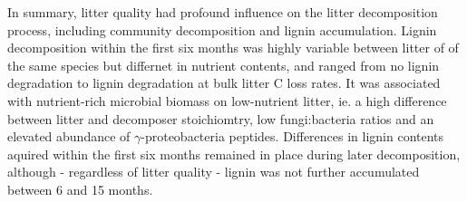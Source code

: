 

In summary, litter quality had profound influence on the litter decomposition process, including community decomposition and lignin accumulation. Lignin decomposition within the first six months was highly variable between litter of of the same species but differnet in nutrient contents, and ranged from no lignin degradation to lignin degradation at bulk litter C loss rates. It was associated with nutrient-rich microbial biomass on low-nutrient litter, ie. a high difference between litter and decomposer stoichiomtry, low fungi:bacteria ratios and an elevated abundance of $\gamma$-proteobacteria peptides. Differences in lignin contents aquired within the first six months remained in place during later decomposition, although - regardless of litter quality - lignin was not further accumulated between 6 and 15 months.
